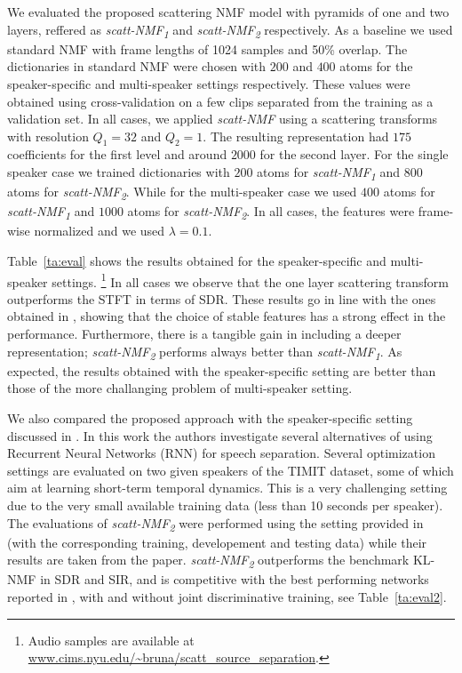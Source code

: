  We evaluated the proposed scattering NMF model with pyramids of one and two layers, reffered
as \emph{scatt-NMF\textsubscript{1}} and \emph{scatt-NMF\textsubscript{2}} respectively. As a baseline we used standard NMF 
with frame lengths of 1024 samples and 50\% overlap. 
%
The dictionaries in standard NMF were chosen with $200$ and $400$ atoms for the speaker-specific and multi-speaker
settings respectively. These values were obtained using cross-validation on a few clips separated from the training as a validation set.
%
In all cases, we applied \emph{scatt-NMF} using a scattering transforms with resolution $Q_1= 32$ and $Q_2=1$.
The resulting representation had $175$ coefficients for the first level and around $2000$ for the second layer. 
%
For the single speaker case we trained dictionaries with $200$ atoms for \emph{scatt-NMF\textsubscript{1}}  and $800$ atoms for \emph{scatt-NMF\textsubscript{2}}.
While for the multi-speaker case we used $400$ atoms for \emph{scatt-NMF\textsubscript{1}}  and $1000$ atoms for \emph{scatt-NMF\textsubscript{2}}.
In all cases, the features were frame-wise normalized and we used $\lambda=0.1$. 
%
%

 Table~\ref{ta:eval} shows the results obtained for the speaker-specific and multi-speaker settings. \footnote{Audio samples are available at \url{www.cims.nyu.edu/~bruna/scatt_source_separation}.}
In all cases we observe that the one layer scattering transform outperforms the STFT in terms of SDR.
These results go in line with the ones obtained in \cite{merl}, showing that the choice of stable
features has a strong effect in the performance. 
Furthermore, there is a tangible gain in including a deeper representation; \emph{scatt-NMF\textsubscript{2}} 
performs always better than \emph{scatt-NMF\textsubscript{1}}. 
As expected, the results obtained with the speaker-specific setting are better than those of the more challanging problem
of multi-speaker setting. 

We also compared the proposed approach with the speaker-specific setting discussed in \cite{Huang_DNN_Separation_ICASSP2014}. In this work
the authors investigate several alternatives of using Recurrent Neural Networks (RNN) for speech separation.
Several optimization settings are evaluated on two given speakers of the TIMIT dataset, some of which
aim at learning short-term temporal dynamics. This is a very challenging setting
due to the very small available training data (less than 10 seconds per speaker). The evaluations of \emph{scatt-NMF\textsubscript{2}} were performed using the setting provided in \cite{Huang_DNN_Separation_ICASSP2014} (with the corresponding training, developement and testing data) while their results are taken from the paper.
\emph{scatt-NMF\textsubscript{2}} outperforms the benchmark KL-NMF in SDR and SIR, and is competitive 
with the best performing networks
reported in \cite{Huang_DNN_Separation_ICASSP2014}, with and without joint discriminative training, see Table~\ref{ta:eval2}.

